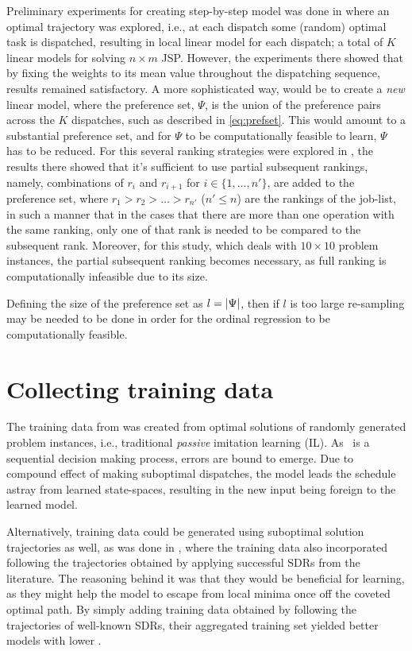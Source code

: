 \documentclass[smallextended]{svjour3}
\begin{document}
Preliminary experiments for creating step-by-step model was done in 
\cite{InRu11a} where an optimal trajectory was explored, i.e., at each dispatch 
some (random) optimal task is dispatched, resulting in local linear model for 
each dispatch; a total of $K$ linear models for solving $n\times m$ JSP. 
However, the experiments there showed that by fixing the weights to its mean 
value throughout the dispatching sequence, results remained satisfactory.
A more sophisticated way, would be to create a \emph{new} linear model, where 
the preference set, $\Psi$, is the union of the preference pairs across the 
$K$ dispatches, such as described in \cref{eq:prefset}. 
This would amount to a substantial preference set, and for $\Psi$ to be 
computationally feasible to learn, $\Psi$ has to be reduced. For this several 
ranking strategies were explored in \cite{InRu15a}, the results there showed 
that it's sufficient to use partial subsequent rankings, namely, combinations 
of $r_i$ and $r_{i+1}$ for $i\in\{1,\ldots,n'\}$, are added to the preference 
set, where $r_1>r_2>\ldots>r_{n'}$ ($n'\leq n$) are the rankings of the 
job-list, in such a manner that in the cases that there are more than one 
operation with the same ranking, only one of that rank is needed to be compared 
to the subsequent rank. 
Moreover, for this study, which deals with $10\times 10$ problem instances, 
the partial subsequent ranking becomes necessary, as full ranking is 
computationally infeasible due to its size. 

Defining the size of the preference set as $l=\lvert\Psi\rvert$, then if  $l$ is too 
large re-sampling may be needed to be done in order for the ordinal regression 
to be computationally feasible. 

\section{Collecting training data}

The training data from \cite{InRu11a} was created from optimal solutions of 
randomly generated problem instances, i.e., traditional \emph{passive} 
imitation learning (IL). 
As \JSP\ is a sequential decision making process, errors are bound to emerge.  
Due to compound effect of making suboptimal dispatches, the model leads the 
schedule astray from learned state-spaces, resulting in the new input being 
foreign to the learned model. 

Alternatively, training data could be generated using suboptimal solution 
trajectories as well, as was done in \cite{InRu15a}, where the training data 
also incorporated following the trajectories obtained by applying successful 
SDRs from the literature. 
The reasoning behind it was that  they would be beneficial for learning, 
as they might help the model to escape from local minima once off the coveted 
optimal path. 
By simply adding training data obtained by following the trajectories of 
well-known SDRs, their aggregated training set yielded better models with lower 
\namerho. 
\end{document}
